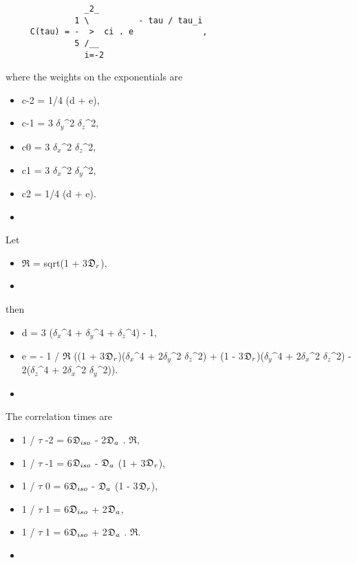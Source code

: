  {\footnotesize \begin{verbatim} 
                _2_ 
              1 \          - tau / tau_i 
     C(tau) = -  >  ci . e              , 
              5 /__ 
                i=-2 
 \end{verbatim}} 

 where the weights on the exponentials are 
  

 \begin{itemize} 
 \item[] c-2 = 1/4 (d + e),  
 \item[] c-1 = 3 $\delta_y$\^{}2 $\delta_z$\^{}2,  
 \item[] c0  = 3 $\delta_x$\^{}2 $\delta_z$\^{}2,  
 \item[] c1  = 3 $\delta_x$\^{}2 $\delta_y$\^{}2,  
 \item[] c2  = 1/4 (d + e).  
 \item[]  
 \end{itemize} 
  

 Let 
  

 \begin{itemize} 
 \item[] $\mathfrak{R}$ = sqrt(1 + 3$\mathfrak{D}_r$),  
 \item[]  
 \end{itemize} 
  

 then 
  

 \begin{itemize} 
 \item[] d = 3 ($\delta_x$\^{}4 + $\delta_y$\^{}4 + $\delta_z$\^{}4) - 1,  
 \item[] e = - 1 / $\mathfrak{R}$ ((1 + 3$\mathfrak{D}_r$)($\delta_x$\^{}4 + 2$\delta_y$\^{}2 $\delta_z$\^{}2) + (1 - 3$\mathfrak{D}_r$)($\delta_y$\^{}4 + 2$\delta_x$\^{}2 $\delta_z$\^{}2) - 2($\delta_z$\^{}4 + 2$\delta_x$\^{}2 $\delta_y$\^{}2)).  
 \item[]  
 \end{itemize} 
  

 The correlation times are 
  

 \begin{itemize} 
 \item[] 1 / $\tau$ -2 = 6$\mathfrak{D}_{iso}$ - 2$\mathfrak{D}_a$ . $\mathfrak{R}$,  
 \item[] 1 / $\tau$ -1 = 6$\mathfrak{D}_{iso}$ - $\mathfrak{D}_a$ (1 + 3$\mathfrak{D}_r$),  
 \item[] 1 / $\tau$ 0  = 6$\mathfrak{D}_{iso}$ - $\mathfrak{D}_a$ (1 - 3$\mathfrak{D}_r$),  
 \item[] 1 / $\tau$ 1  = 6$\mathfrak{D}_{iso}$ + 2$\mathfrak{D}_a$,  
 \item[] 1 / $\tau$ 1  = 6$\mathfrak{D}_{iso}$ + 2$\mathfrak{D}_a$ . $\mathfrak{R}$.  
 \item[]  
 \end{itemize} 
  

